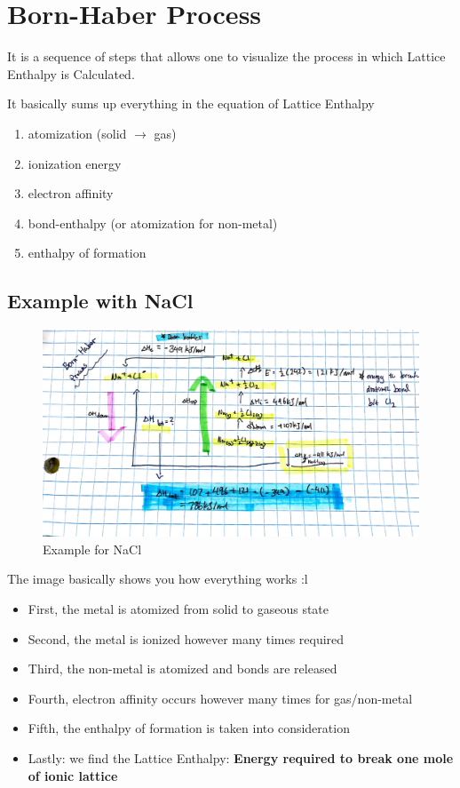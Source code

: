 \documentclass[12pt]{article} %
\begin{document}
\section{Born-Haber Process}

It is a sequence of steps that allows one to visualize the process in which Lattice Enthalpy is Calculated.

It basically sums up everything in the equation of Lattice Enthalpy

\begin{enumerate}
\item atomization (solid $\rightarrow$ gas)
\item ionization energy
\item electron affinity
\item bond-enthalpy (or atomization for non-metal)
\item enthalpy of formation
\end{enumerate}


\subsection{Example with NaCl}


\begin{figure}[h]
	\centering
	\includegraphics[width=\textwidth]{../images/1.4fig1.JPG}
	\caption{Example for NaCl}
	\label{figure:image}
\end{figure}

The image basically shows you how everything works :l

\begin{itemize}
\item First, the metal is atomized from solid to gaseous state
\item Second, the metal is ionized however many times required
\item Third, the non-metal is atomized and bonds are released
\item Fourth, electron affinity occurs however many times for gas/non-metal
\item Fifth, the enthalpy of formation is taken into consideration
\item Lastly: we find the Lattice Enthalpy: \textbf{Energy required to break one mole of ionic lattice}
\end{itemize}
\end{document}
